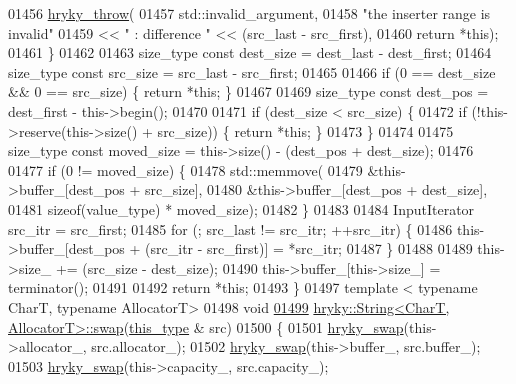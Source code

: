 \begin{DoxyCode}
01456         \hyperlink{debug__common_8h_af50606eac4009921527ddcaed392b2c2}{hryky_throw}(
01457             std::invalid\_argument,
01458             \textcolor{stringliteral}{"the inserter range is invalid"}
01459             << \textcolor{stringliteral}{" : difference "} << (src\_last - src\_first),
01460             \textcolor{keywordflow}{return} *\textcolor{keyword}{this});
01461     \}
01462 
01463     size\_type \textcolor{keyword}{const} dest\_size   = dest\_last - dest\_first;
01464     size\_type \textcolor{keyword}{const} src\_size    = src\_last - src\_first;
01465 
01466     \textcolor{keywordflow}{if} (0 == dest\_size && 0 == src\_size) \{ \textcolor{keywordflow}{return} *\textcolor{keyword}{this}; \}
01467 
01469     size\_type \textcolor{keyword}{const} dest\_pos = dest\_first - this->begin();
01470 
01471     \textcolor{keywordflow}{if} (dest\_size < src\_size) \{
01472         \textcolor{keywordflow}{if} (!this->reserve(this->size() + src\_size)) \{ \textcolor{keywordflow}{return} *\textcolor{keyword}{this}; \}
01473     \}
01474 
01475     size\_type \textcolor{keyword}{const} moved\_size = this->size() - (dest\_pos + dest\_size);
01476 
01477     \textcolor{keywordflow}{if} (0 != moved\_size) \{
01478         std::memmove(
01479             &this->buffer\_[dest\_pos + src\_size],
01480             &this->buffer\_[dest\_pos + dest\_size],
01481             \textcolor{keyword}{sizeof}(value\_type) * moved\_size);
01482     \}
01483 
01484     InputIterator src\_itr = src\_first;
01485     \textcolor{keywordflow}{for} (; src\_last != src\_itr; ++src\_itr) \{
01486         this->buffer\_[dest\_pos + (src\_itr - src\_first)] = *src\_itr;
01487     \}
01488 
01489     this->size\_ += (src\_size - dest\_size);
01490     this->buffer\_[this->size\_] = terminator();
01491 
01492     \textcolor{keywordflow}{return} *\textcolor{keyword}{this};
01493 \}
01497 \textcolor{keyword}{template} < \textcolor{keyword}{typename} CharT, \textcolor{keyword}{typename} AllocatorT>
01498 \textcolor{keywordtype}{void} 
\hypertarget{string_8h_source_l01499}{}\hyperlink{classhryky_1_1_string_a5ff47f11c86f2cf71e7e2d1427c1474b}{01499} \hyperlink{namespacehryky_a4282146df5ea2b68cb667896a2205909}{hryky::String<CharT, AllocatorT>::swap}(\hyperlink{classhryky_1_1_string}{this_type} & src)
01500 \{
01501     \hyperlink{namespacehryky_add9c1c1fdfda07cd47bcb7c16d3a823a}{hryky_swap}(this->allocator\_,   src.allocator\_);
01502     \hyperlink{namespacehryky_add9c1c1fdfda07cd47bcb7c16d3a823a}{hryky_swap}(this->buffer\_,      src.buffer\_);
01503     \hyperlink{namespacehryky_add9c1c1fdfda07cd47bcb7c16d3a823a}{hryky_swap}(this->capacity\_,    src.capacity\_);

\end{DoxyCode}
